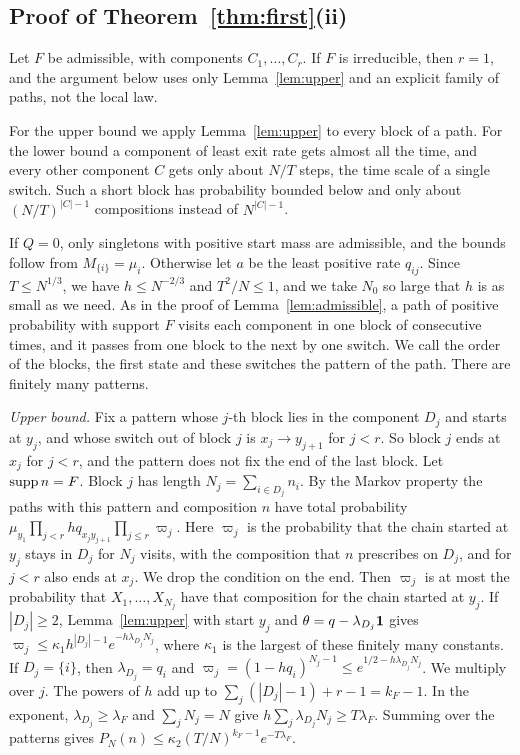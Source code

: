 \subsection{Proof of \texorpdfstring{Theorem~\ref{thm:first}(ii)}{the
first-order bounds}}\label{app:first}

Let $F$ be admissible, with components $C_1,\dots,C_r$. If $F$ is irreducible,
then $r=1$, and the argument below uses only Lemma~\ref{lem:upper} and an explicit
family of paths, not the local law.

For the upper bound we apply Lemma~\ref{lem:upper} to every block of a path.
For the lower bound a component of least exit rate gets almost all the time,
and every other component $C$ gets only about $N/T$ steps, the time scale of a
single switch. Such a short block has probability bounded below and only about
$(N/T)^{|C|-1}$ compositions instead of $N^{|C|-1}$.

If $Q=0$, only singletons with positive start mass are admissible, and the bounds
follow from $M_{\{i\}}=\mu_i$. Otherwise let $a$ be the least positive rate $q_{ij}$.
Since $T\le N^{1/3}$, we have
$h\le N^{-2/3}$ and $T^2/N\le1$, and we take $N_0$ so large that $h$ is as
small as we need. As in the
proof of Lemma~\ref{lem:admissible}, a path of positive probability with
support $F$ visits each component in one block of consecutive times, and it
passes from one block to the next by one switch. We call the order of the
blocks, the first state and these switches the pattern of the path. There are
finitely many patterns.

\emph{Upper bound.} Fix a pattern whose $j$-th block lies in the component
$D_j$ and starts at $y_j$, and whose switch out of block $j$ is
$x_j\to y_{j+1}$ for $j<r$. So block $j$ ends at $x_j$ for $j<r$, and the
pattern does not fix the end of the last block. Let $\operatorname{supp} n=F$. Block $j$ has
length $N_j=\sum_{i\in D_j}n_i$. By the Markov property the paths with this
pattern and composition $n$ have total probability
$\mu_{y_1}\prod_{j<r}hq_{x_jy_{j+1}}\prod_{j\le r}\varpi_j$. Here $\varpi_j$ is the
probability that the chain started at $y_j$ stays in $D_j$ for $N_j$ visits,
with the composition that $n$ prescribes on $D_j$, and for $j<r$ also ends
at $x_j$. We drop the condition on the end. Then $\varpi_j$ is at most the probability that
$X_1,\dots,X_{N_j}$ have that composition for the chain started at $y_j$. If
$|D_j|\ge2$, Lemma~\ref{lem:upper} with start $y_j$ and
$\theta=q-\lambda_{D_j}\mathbf{1}$ gives
$\varpi_j\le\kappa_1h^{|D_j|-1}e^{-h\lambda_{D_j}N_j}$, where
$\kappa_1$ is the largest of these finitely many constants. If $D_j=\{i\}$,
then $\lambda_{D_j}=q_i$ and
$\varpi_j=(1-hq_i)^{N_j-1}\le e^{1/2-h\lambda_{D_j}N_j}$. We multiply over
$j$. The powers of $h$ add up to $\sum_j(|D_j|-1)+r-1=k_F-1$. In the
exponent, $\lambda_{D_j}\ge\lambda_F$ and $\sum_jN_j=N$ give
$h\sum_j\lambda_{D_j}N_j\ge T\lambda_F$. Summing over the patterns
gives $P_N(n)\le\kappa_2(T/N)^{k_F-1}e^{-T\lambda_F}$.

